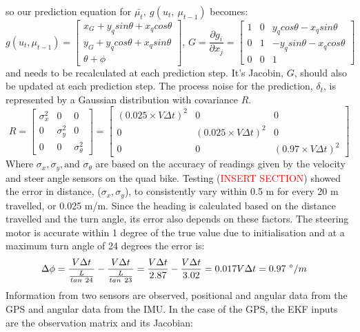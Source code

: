 \documentclass[main.tex]{subfiles}
\begin{document}
so our prediction equation for $\bar{\mu_t},\ g(u_t,\ \mu_{t-1})$ becomes:
\[
g(u_t, \mu_{t-1}) =
\begin{bmatrix}
	x_G + y_qsin\theta + x_qcos\theta\\
    y_G + y_qcos\theta + x_qsin\theta\\
    \theta + \phi
\end{bmatrix}
\textrm{, } G = \frac{\partial g_i}{\partial x_j} =
\begin{bmatrix}
    1	&	0	&	y_qcos\theta - x_qsin\theta\\
    0	&	1	&	-y_qsin\theta - x_qcos\theta\\
    0	&	0	&	1
\end{bmatrix}
\]
and needs to be recalculated at each prediction step. It's Jacobin, $G$, should also be updated at each prediction step. The process noise for the prediction, $\delta_t$, is represented by a Gaussian distribution with covariance $R$.
\[
R =
\begin{bmatrix}
    \sigma_x^2	&	0	&	0\\
    0	&	\sigma_y^2	&	0\\
    0	&	0	&	\sigma_\theta^2
\end{bmatrix}
=
\begin{bmatrix}
    (0.025 \times V\Delta t)^2	&	0	&	0\\
    0	&	(0.025 \times V\Delta t)^2	&	0\\
    0	&	0	&	(0.97 \times V\Delta t)^2
\end{bmatrix}
\]
Where $\sigma_x, \sigma_y, \textrm{and } \sigma_\theta$ are based on the accuracy of readings given by the velocity and steer angle sensors on the quad bike. Testing (\textcolor{red}{INSERT SECTION}) showed the error in distance, ($\sigma_x, \sigma_y$), to consistently vary within 0.5 m for every 20 m travelled, or 0.025 m/m. Since the heading is calculated based on the distance travelled and the turn angle, its error also depends on these factors. The steering motor is accurate within 1 degree of the true value due to initialisation and at a maximum turn angle of 24 degrees the error is:
\begin{align*}
&\Delta\phi = \frac{V\Delta t}{\frac{L}{tan\ 24}} - \frac{V\Delta t}{\frac{L}{tan\ 23}} = \frac{V\Delta t}{2.87} - \frac{V\Delta t}{3.02} = 0.017V\Delta t = 0.97\ \degree/m
\end{align*}
Information from two sensors are observed, positional and angular data from the GPS and angular data from the IMU. In the case of the GPS, the EKF inputs are the observation matrix and its Jacobian:
\end{document}
